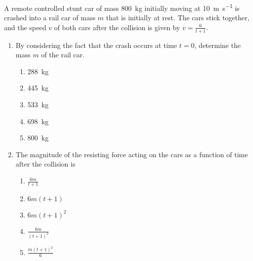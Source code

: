 \documentclass{../../oss-apphys}
\begin{document}
\begin{multicols}{2}
  A remote controlled stunt car of mass \SI{800}{\kilo\gram} initially moving at
  \SI{10}{\metre\per\second} is crashed into a rail car of mass $m$ that is
  initially at rest. The cars stick together, and the speed $v$ of both cars
  after the collision is given by $\displaystyle v=\frac{6}{t+1}$.
  \begin{enumerate}[resume,leftmargin=18pt]
  \item By considering the fact that the crash occurs at time $t=0$, determine
    the mass $m$ of the rail car.
    \begin{enumerate}[noitemsep,topsep=0pt,leftmargin=18pt,label=(\Alph*)]
    \item\SI{288}{\kilo\gram}
    \item\SI{445}{\kilo\gram}
    \item\SI{533}{\kilo\gram}
    \item\SI{698}{\kilo\gram}
    \item\SI{800}{\kilo\gram}
    \end{enumerate}
    
  \item The magnitude of the resisting force acting on the cars as a function of
    time after the collision is
    \begin{enumerate}[noitemsep,topsep=0pt,leftmargin=18pt,label=(\Alph*)]
    \item $\displaystyle \frac{6m}{t+1}$
    \item $6m(t+1)$
    \item $6m(t+1)^2$
    \item $\displaystyle\frac{6m}{(t+1)^2}$
    \item $\displaystyle\frac{m(t+1)^2}{6}$
    \end{enumerate}
    


\end{enumerate}
\end{multicols}
\end{document}
